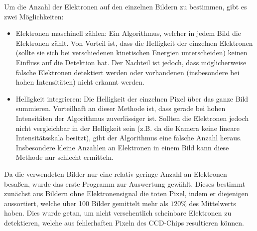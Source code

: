 \documentclass[bachelor,       %
               twoside,        %
               BCOR10mm,       %
               english,ngerman, %
               ]{GAUBM}
\begin{document}
Um die Anzahl der Elektronen auf den einzelnen Bildern zu bestimmen, gibt es zwei Möglichkeiten:
\begin{itemize}
\item Elektronen maschinell zählen: Ein Algorithmus, welcher in jedem Bild die Elektronen zählt.
	Von Vorteil ist, dass die Helligkeit der einzelnen Elektronen (sollte sie sich bei verschiedenen kinetischen Energien unterscheiden) keinen Einfluss auf die Detektion hat.
	Der Nachteil ist jedoch, dass möglicherweise falsche Elektronen detektiert werden oder vorhandenen (insbesondere bei hohen Intensitäten) nicht erkannt werden.
\item Helligkeit integrieren: Die Helligkeit der einzelnen Pixel über das ganze Bild summieren.
	Vorteilhaft an dieser Methode ist, dass gerade bei hohen Intensitäten der Algorithmus zuverlässiger ist.
	Sollten die Elektronen jedoch nicht vergleichbar in der Helligkeit sein (z.B. da die Kamera keine lineare Intensitätsskala besitzt),  gibt der Algorithmus eine falsche Anzahl heraus.
	Insbesondere kleine Anzahlen an Elektronen in einem Bild kann diese Methode nur schlecht ermitteln.
\end{itemize}

Da die verwendeten Bilder nur eine relativ geringe Anzahl an Elektronen besa{\ss}en, wurde das erste Programm zur Auswertung gewählt.
Dieses bestimmt zunächst aus Bildern ohne Elektronensignal die toten Pixel, indem er diejenigen aussortiert, welche über 100 Bilder gemittelt mehr als $120\%$ des Mittelwerts haben.
Dies wurde getan, um nicht versehentlich scheinbare Elektronen zu detektieren, welche aus fehlerhaften Pixeln des CCD-Chips resultieren können.
\end{document}
